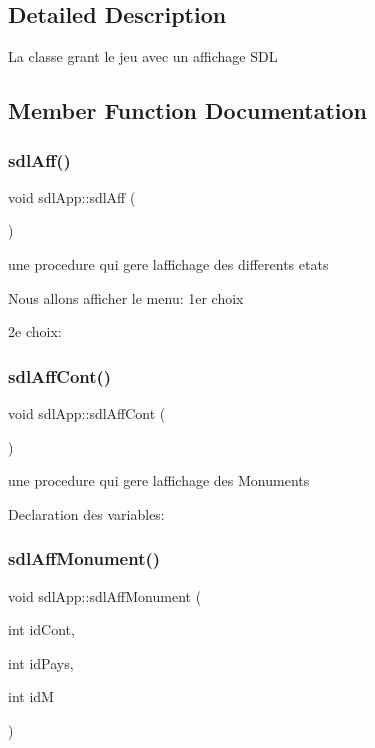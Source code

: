 \subsection{Detailed Description}
La classe grant le jeu avec un affichage S\+DL 

\subsection{Member Function Documentation}
\mbox{\label{classsdlApp_a4efd1a7e53fc14b582d5fe0cf2dddc0b}} 
\subsubsection{\texorpdfstring{sdl\+Aff()}{sdlAff()}}
{\footnotesize\ttfamily void sdl\+App\+::sdl\+Aff (\begin{DoxyParamCaption}{ }\end{DoxyParamCaption})}



une procedure qui gere l\textquotesingle{}affichage des differents etats 

Nous allons afficher le menu\+: 1er choix

2e choix\+: \mbox{\label{classsdlApp_a54d9cd6155163835380a535ca257e5b4}} 
\subsubsection{\texorpdfstring{sdl\+Aff\+Cont()}{sdlAffCont()}}
{\footnotesize\ttfamily void sdl\+App\+::sdl\+Aff\+Cont (\begin{DoxyParamCaption}{ }\end{DoxyParamCaption})}



une procedure qui gere l\textquotesingle{}affichage des Monuments 

Declaration des variables\+: \mbox{\label{classsdlApp_a6fadeb27ecf0fee2504d3130e911abf8}} 
\subsubsection{\texorpdfstring{sdl\+Aff\+Monument()}{sdlAffMonument()}}
{\footnotesize\ttfamily void sdl\+App\+::sdl\+Aff\+Monument (\begin{DoxyParamCaption}\item[{int}]{id\+Cont,  }\item[{int}]{id\+Pays,  }\item[{int}]{idM }\end{DoxyParamCaption})}



